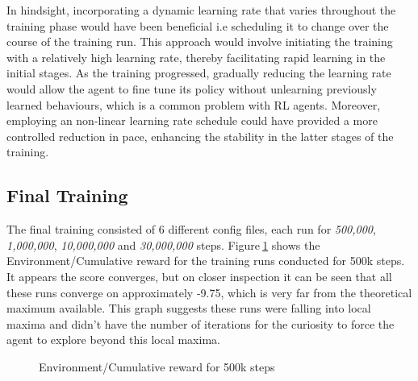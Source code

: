 In hindsight, incorporating a dynamic learning rate that varies throughout the training phase would have been beneficial i.e scheduling it to change over the course of the training run. This approach would involve initiating the training with a relatively high learning rate, thereby facilitating rapid learning in the initial stages. As the training progressed, gradually reducing the learning rate would allow the agent to fine tune its policy without unlearning previously learned behaviours, which is a common problem with RL agents. Moreover, employing an non-linear learning rate schedule could have provided a more controlled reduction in pace, enhancing the stability in the latter stages of the training. 



\subsection{Final Training}

The final training consisted of 6 different config files, each run for \textit{500,000}, \textit{1,000,000}, \textit{10,000,000} and \textit{30,000,000} steps. Figure$~$\ref{500k_steps} shows the Environment/Cumulative reward for the training runs conducted for 500k steps. It appears the score converges, but on closer inspection it can be seen that all these runs converge on approximately -9.75, which is very far from the theoretical maximum available. This graph suggests these runs were falling into local maxima and didn't have the number of iterations for the curiosity to force the agent to explore beyond this local maxima.
\begin{figure}[!htb]
    \centering
    \caption{Environment/Cumulative reward for 500k steps}\label{500k_steps}
\end{figure}

